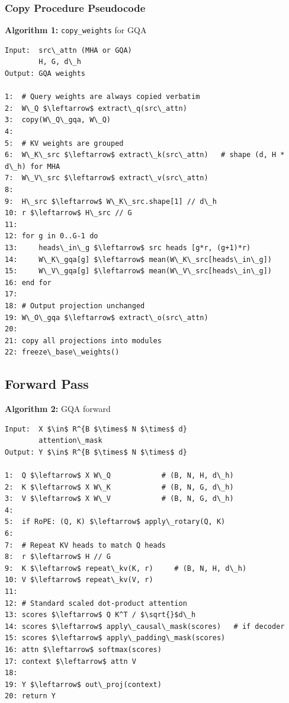 \subsubsection{Copy Procedure Pseudocode}

\textbf{Algorithm 1:} \texttt{copy\_weights} for GQA
\begin{lstlisting}
Input:  src\_attn (MHA or GQA)
        H, G, d\_h
Output: GQA weights

1:  # Query weights are always copied verbatim
2:  W\_Q $\leftarrow$ extract\_q(src\_attn)
3:  copy(W\_Q\_gqa, W\_Q)
4:
5:  # KV weights are grouped
6:  W\_K\_src $\leftarrow$ extract\_k(src\_attn)   # shape (d, H * d\_h) for MHA
7:  W\_V\_src $\leftarrow$ extract\_v(src\_attn)
8:
9:  H\_src $\leftarrow$ W\_K\_src.shape[1] // d\_h
10: r $\leftarrow$ H\_src // G
11:
12: for g in 0..G-1 do
13:     heads\_in\_g $\leftarrow$ src heads [g*r, (g+1)*r)
14:     W\_K\_gqa[g] $\leftarrow$ mean(W\_K\_src[heads\_in\_g])
15:     W\_V\_gqa[g] $\leftarrow$ mean(W\_V\_src[heads\_in\_g])
16: end for
17:
18: # Output projection unchanged
19: W\_O\_gqa $\leftarrow$ extract\_o(src\_attn)
20:
21: copy all projections into modules
22: freeze\_base\_weights()
\end{lstlisting}

\subsection{Forward Pass}

\textbf{Algorithm 2:} GQA forward
\begin{lstlisting}
Input:  X $\in$ R^{B $\times$ N $\times$ d}
        attention\_mask
Output: Y $\in$ R^{B $\times$ N $\times$ d}

1:  Q $\leftarrow$ X W\_Q            # (B, N, H, d\_h)
2:  K $\leftarrow$ X W\_K            # (B, N, G, d\_h)
3:  V $\leftarrow$ X W\_V            # (B, N, G, d\_h)
4:
5:  if RoPE: (Q, K) $\leftarrow$ apply\_rotary(Q, K)
6:
7:  # Repeat KV heads to match Q heads
8:  r $\leftarrow$ H // G
9:  K $\leftarrow$ repeat\_kv(K, r)     # (B, N, H, d\_h)
10: V $\leftarrow$ repeat\_kv(V, r)
11:
12: # Standard scaled dot-product attention
13: scores $\leftarrow$ Q K^T / $\sqrt{}$d\_h
14: scores $\leftarrow$ apply\_causal\_mask(scores)   # if decoder
15: scores $\leftarrow$ apply\_padding\_mask(scores)
16: attn $\leftarrow$ softmax(scores)
17: context $\leftarrow$ attn V
18:
19: Y $\leftarrow$ out\_proj(context)
20: return Y
\end{lstlisting}

